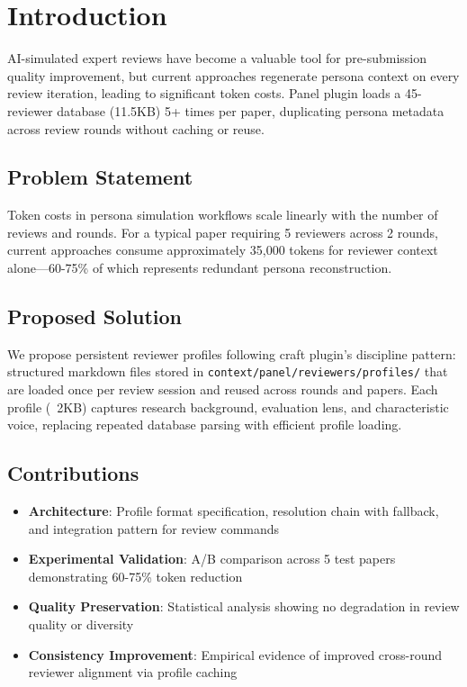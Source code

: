 \section{Introduction}

AI-simulated expert reviews have become a valuable tool for pre-submission quality improvement, but current approaches regenerate persona context on every review iteration, leading to significant token costs. Panel plugin loads a 45-reviewer database (11.5KB) 5+ times per paper, duplicating persona metadata across review rounds without caching or reuse.

\subsection{Problem Statement}

Token costs in persona simulation workflows scale linearly with the number of reviews and rounds. For a typical paper requiring 5 reviewers across 2 rounds, current approaches consume approximately 35,000 tokens for reviewer context alone—60-75\% of which represents redundant persona reconstruction.

\subsection{Proposed Solution}

We propose persistent reviewer profiles following craft plugin's discipline pattern: structured markdown files stored in \texttt{context/panel/reviewers/profiles/} that are loaded once per review session and reused across rounds and papers. Each profile (~2KB) captures research background, evaluation lens, and characteristic voice, replacing repeated database parsing with efficient profile loading.

\subsection{Contributions}

\begin{itemize}
\item \textbf{Architecture}: Profile format specification, resolution chain with fallback, and integration pattern for review commands
\item \textbf{Experimental Validation}: A/B comparison across 5 test papers demonstrating 60-75\% token reduction
\item \textbf{Quality Preservation}: Statistical analysis showing no degradation in review quality or diversity
\item \textbf{Consistency Improvement}: Empirical evidence of improved cross-round reviewer alignment via profile caching
\end{itemize}
